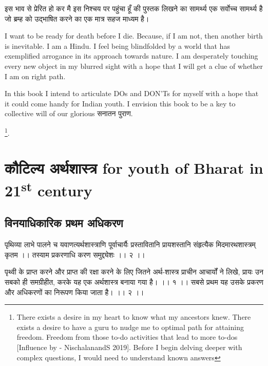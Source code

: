 \documentclass[oneside,11pt]{memoir} %
\begin{document}
इस भाव से प्रेरित हो कर मै इस निश्चय पर पहुंचा हूँ की पुस्तक लिखने का सामर्थ्य एक सर्वोच्च सामर्थ्य है जो ब्रम्ह को उद्भाषित करने का एक मात्र सहज माध्यम है। 

I want to be ready for death before I die. Because, if I am not, then another birth is inevitable. I am a Hindu. I feel being blindfolded by a world that has exemplified arrogance in its approach towards nature. I am desperately touching every new object in my blurred sight with a hope that I will get a clue of whether I am on right path.

In this book I intend to articulate DOs and DON'Ts for myself with a hope that it could come handy for Indian youth. I envision this book to be a key to collective will of our glorious सनातन पुराण.
 
\footnote{There exists a desire in my heart to know what my ancestors knew. There exists a desire to have a guru to nudge me to optimal path for attaining freedom. Freedom from those to-do activities that lead to more to-dos [Influence by - NischalanandS 2019]. Before I begin delving deeper with complex questions, I would need to understand known answers}.


\part{कौटिल्य अर्थशास्त्र for youth of Bharat in 21\textsuperscript{st} century}



\chapter{विनयाधिकारिक प्रथम अधिकरण}


पृथिव्या लाभे पालने च यवाणत्यर्थशास्त्राणि पूर्वाचार्यैः प्रस्तावितानि प्रायशस्तानि संहृत्यैक मिदमारथशास्त्रम् कृतम ।। 
तस्याम प्रकरणाधि करण समुद्द्येशः ।। २ ।। 

पृथ्वी के प्राप्त करने और प्राप्त की रक्षा करने के लिए जितने अर्थ-शास्त्र प्राचीन आचार्यों ने लिखे, प्रायः उन सबको ही समग्रीहीत, करके यह एक अर्थशास्त्र बनाया गया है। ।। १ ।।  सबसे प्रथम यह उसके प्रकरण और अधिकरणों का निरूपण किया जाता है। ।। २ ।। 
\end{document}
